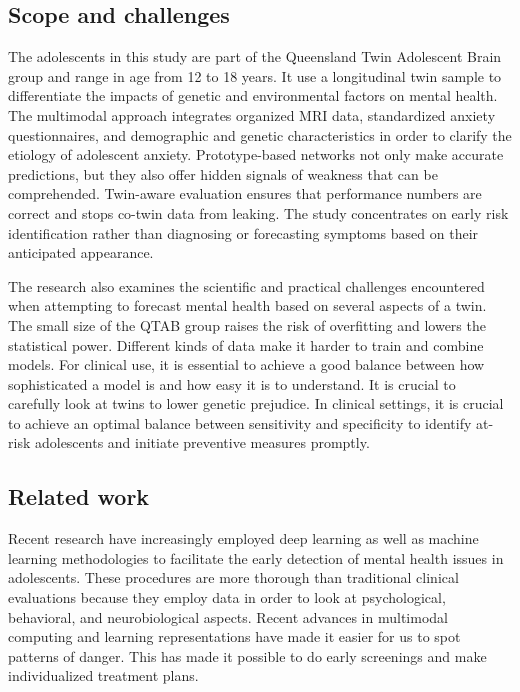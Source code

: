 \documentclass[10pt,letterpaper]{article}
\begin{document}
\subsection*{Scope and challenges}
The adolescents in this study are part of the Queensland Twin Adolescent Brain group and range in age from 12 to 18 years. It use a longitudinal twin sample to differentiate the impacts of genetic and environmental factors on mental health. The multimodal approach integrates organized MRI data, standardized anxiety questionnaires, and demographic and genetic characteristics in order to clarify the etiology of adolescent anxiety. Prototype-based networks not only make accurate predictions, but they also offer hidden signals of weakness that can be comprehended. Twin-aware evaluation ensures that performance numbers are correct and stops co-twin data from leaking. The study concentrates on early risk identification rather than diagnosing or forecasting symptoms based on their anticipated appearance.

The research also examines the scientific and practical challenges encountered when attempting to forecast mental health based on several aspects of a twin. The small size of the QTAB group raises the risk of overfitting and lowers the statistical power. Different kinds of data make it harder to train and combine models. For clinical use, it is essential to achieve a good balance between how sophisticated a model is and how easy it is to understand. It is crucial to carefully look at twins to lower genetic prejudice. In clinical settings, it is crucial to achieve an optimal balance between sensitivity and specificity to identify at-risk adolescents and initiate preventive measures promptly.

\subsection*{Related work}

Recent research have increasingly employed deep learning as well as machine learning methodologies to facilitate the early detection of mental health issues in adolescents. These procedures are more thorough than traditional clinical evaluations because they employ data in order to look at psychological, behavioral, and neurobiological aspects. Recent advances in multimodal computing and learning representations have made it easier for us to spot patterns of danger. This has made it possible to do early screenings and make individualized treatment plans.
\end{document}
